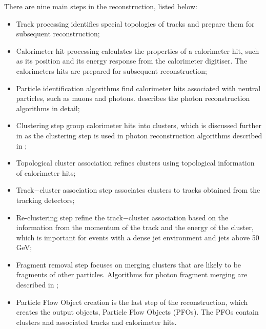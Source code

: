 There are nine main steps in the \pandora reconstruction, listed below:
\begin{itemize}
  \item Track processing  identifies special topologies of tracks and prepare them for subsequent reconstruction;
  \item Calorimeter hit processing calculates the properties of a calorimeter hit, such  as its position and its energy response from the calorimeter digitiser. The calorimeters hits are prepared for  subsequent reconstruction;
  \item Particle identification algorithms find calorimeter hits associated with neutral particles, such as muons and photons.  describes the photon reconstruction  algorithms in detail;
  \item Clustering step group calorimeter hits into clusters, which is discussed further in  as the clustering step is used in photon reconstruction  algorithms described in ;
  \item Topological cluster association refines clusters using topological information of calorimeter hits;
  \item Track$-$cluster association step associates clusters to tracks obtained from the tracking detectors;
  \item Re-clustering step refine the track$-$cluster association based on the information from the momentum of the track and the energy of the cluster, which is important for events with a dense jet environment and jets above 50\,GeV;
  \item Fragment removal step  focuses on merging clusters that are likely to be fragments of other particles. Algorithms for photon fragment merging  are described in ;
  \item Particle Flow Object creation is the last step of the \pandora reconstruction, which creates the output objects, Particle Flow Objects (PFOs). The PFOs contain clusters and associated tracks and calorimeter hits.
\end{itemize}

